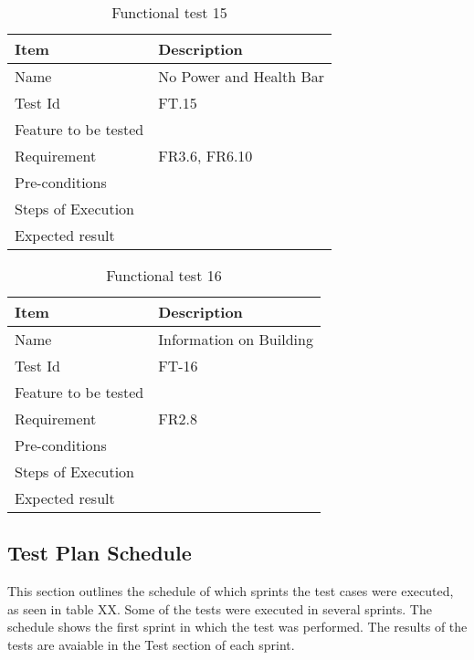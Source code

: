 \begin{table}[H]
\centering
	\begin{tabular}{ l | p{8cm} }
		\hline
		{\bf Item} & {\bf Description} \\ \hline
		Name & No Power and Health Bar \\ 
		Test Id & FT.15 \\ 
		Feature to be tested & \\ 
		Requirement & FR3.6, FR6.10 \\ 
		Pre-conditions &  \\ 
		Steps of Execution &  \\ 
		Expected result & \\ 
	\end{tabular}
	\caption{Functional test 15}
\end{table}

\begin{table}[H]
\centering
	\begin{tabular}{ l | p{8cm} }
		\hline
		{\bf Item} & {\bf Description} \\ \hline
		Name & Information on Building \\ 
		Test Id & FT-16 \\ 
		Feature to be tested &  \\ 
		Requirement & FR2.8 \\ 
		Pre-conditions & \\ 
		Steps of Execution & \\ 
		Expected result & \\ 
	\end{tabular}
	\caption{Functional test 16}
\end{table}


\subsection{Test Plan Schedule}

This section outlines the schedule of which sprints the test cases were executed, as seen in table XX. Some of the tests were executed in several sprints. The schedule shows the first sprint in which the test was performed. The results of the tests are avaiable in the Test section of each sprint.


